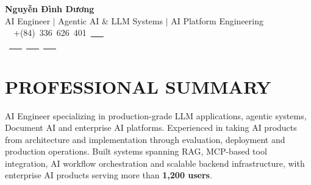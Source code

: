 \documentclass[letterpaper,11pt]{article}
\begin{document}

\begin{center}

    {\huge \textbf{Nguyễn Đình Dương}} \\[3pt]

    {\large
    \textcolor{airforceblue}{
        AI Engineer $|$ Agentic AI \& LLM Systems $|$ AI Platform Engineering
    }} \\[5pt]

    {\small
    \mbox{
        \faPhone\ +(84) 336 626 401
        \quad \textbar \quad
        \href{mailto:2901nguyendinhduong@gmail.com}{
            \faEnvelope\ \color{blue}{2901nguyendinhduong@gmail.com}
        }
    }
    } \\[3pt]

    {\small
    \mbox{
        \href{https://www.linkedin.com/in/nguyen-dinh-duong-074242248/}{
            \faLinkedin\ \color{blue}{LinkedIn}
        }
        \quad \textbar \quad
        \href{https://github.com/duongnguyen291}{
            \faGithub\ \color{blue}{GitHub}
        }
        \quad \textbar \quad
        \href{https://duongnguyen.info/}{
            \faGlobe\ \color{blue}{Portfolio}
        }
    }
    }

\end{center}

\vspace{-8pt}


\section{\color{airforceblue}PROFESSIONAL SUMMARY}

\small{
AI Engineer specializing in production-grade LLM applications,
agentic systems, Document AI and enterprise AI platforms.
Experienced in taking AI products from architecture and implementation
through evaluation, deployment and production operations.
Built systems spanning RAG, MCP-based tool integration,
AI workflow orchestration and scalable backend infrastructure,
with enterprise AI products serving more than \textbf{1,200 users}.
}

\vspace{-7pt}
\end{document}
